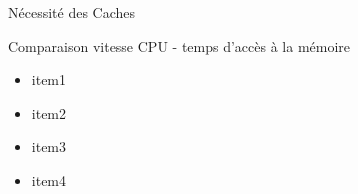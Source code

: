 %
\begin{Frame}{Nécessité des Caches}
      \begin{block}{Comparaison vitesse CPU - temps d'accès à la mémoire}
        \begin{itemize}
        \item item1
        \item item2
        \item item3
        \item item4
        \end{itemize}
      \end{block} 
      
\end{Frame}


